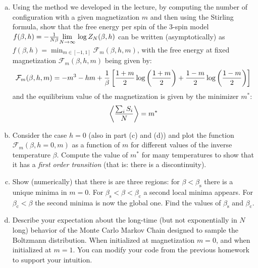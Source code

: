 \documentclass[a4paper,oneside,12pt]{article}
\begin{document}
\begin{enumerate}[(a)]
\item 
        Using the method we developed in the lecture, by computing the number of configuration with a given magnetization $ m $ and then using the Stirling formula, show that the free energy per spin of the 3-spin model 
        $
            f(\beta, h) = -\frac{1}{N \beta} \underset{N \to \infty}{\lim}\, \log{Z_N(\beta,h)}
        $
        can be written (asymptotically) as
        $
            f(\beta, h) = \min_{m \in [-1,1]} \mathcal{F}_m(\beta, h, m)
        $,
        with the free energy at fixed magnetization $ \mathcal{F}_m(\beta, h, m) $ being given by:
        \begin{equation*}
            \mathcal{F}_m(\beta, h, m)
            = -m^3 - h m + \frac{1}{\beta} \left\lbrack  \frac{1+m}{2} \log \left(  \frac{1+m}{2}  \right) + \frac{1-m}{2} \log \left(  \frac{1-m}{2}  \right)  \right\rbrack
        \end{equation*}
        and the equilibrium value of the magnetization is given by the minimizer $ m^* $:
        \begin{equation*}
            \left\langle  \frac{\sum_i S_i}{N}  \right\rangle = m^*
        \end{equation*}
\item 
        Consider the case $ h=0 $ (also in part (c) and (d)) and plot the function $ \mathcal{F}_m(\beta, h=0, m) $ as a function of $ m $ for different values of the inverse temperature $ \beta $.
        Compute the value of $ m^* $ for many temperatures to show that it has a \textit{first order transition} (that is: there is a discontinuity).
\item 
        Show (numerically) that there is are three regions: for $ \beta < \beta_{\mathrm{s}} $ there is a unique minima in $ m=0 $. 
        For $ \beta_{\mathrm{s}} < \beta < \beta_{\mathrm{c}} $ a second local minima appears. 
        For $ \beta_{\mathrm{c}} < \beta $ the second minima is now the global one. 
        Find the values of $ \beta_{\mathrm{s}} $ and $ \beta_{\mathrm{c}} $.
\item
        Describe your expectation about the long-time (but not exponentially in $ N $ long) behavior of the Monte Carlo Markov Chain designed to sample the Boltzmann distribution. 
        When initialized at magnetization $ m=0 $, and when initialized at $ m=1 $. 
        You can modify your code from the previous homework to support your intuition.
\end{enumerate}
\end{document}
